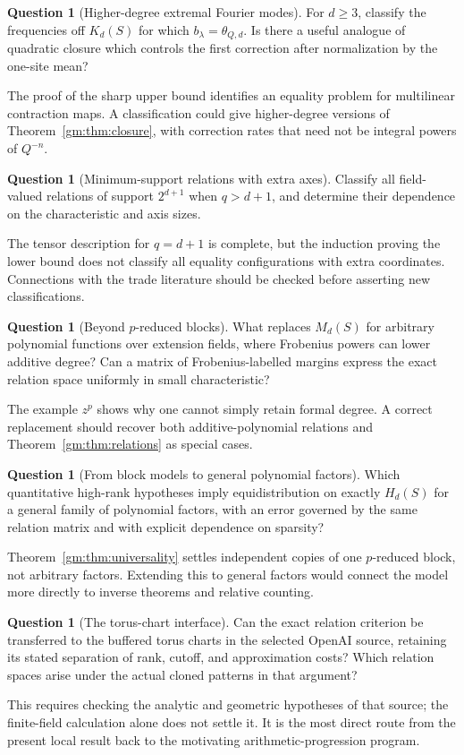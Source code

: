 \documentclass[11pt,a4paper]{article}
\numberwithin{equation}{section}
\theoremstyle{definition}
\newtheorem{question}[theorem]{Question}
\theoremstyle{remark}
\newcommand{\1}{\mathbf 1}
\begin{document}
\begin{question}[Higher-degree extremal Fourier modes]
For $d\geq3$, classify the frequencies off $K_d(S)$ for which
$b_\lambda=\theta_{Q,d}$. Is there a useful analogue of quadratic closure
which controls the first correction after normalization by the one-site
mean?
\end{question}
The proof of the sharp upper bound identifies an equality problem for
multilinear contraction maps. A classification could give higher-degree
versions of Theorem~\ref{gm:thm:closure}, with correction rates that need
not be integral powers of $Q^{-n}$.

\begin{question}[Minimum-support relations with extra axes]
Classify all field-valued relations of support $2^{d+1}$ when $q>d+1$,
and determine their dependence on the characteristic and axis sizes.
\end{question}
The tensor description for $q=d+1$ is complete, but the induction proving
the lower bound does not classify all equality configurations with extra
coordinates. Connections with the trade literature should be checked
before asserting new classifications.

\begin{question}[Beyond $p$-reduced blocks]
What replaces $M_d(S)$ for arbitrary polynomial functions over extension
fields, where Frobenius powers can lower additive degree? Can a matrix of
Frobenius-labelled margins express the exact relation space uniformly in
small characteristic?
\end{question}
The example $z^p$ shows why one cannot simply retain formal degree. A
correct replacement should recover both additive-polynomial relations and
Theorem~\ref{gm:thm:relations} as special cases.

\begin{question}[From block models to general polynomial factors]
Which quantitative high-rank hypotheses imply equidistribution on exactly
$H_d(S)$ for a general family of polynomial factors, with an error governed
by the same relation matrix and with explicit dependence on sparsity?
\end{question}
Theorem~\ref{gm:thm:universality} settles independent copies of one
$p$-reduced block, not arbitrary factors. Extending this to general factors
would connect the model more directly to inverse theorems and relative
counting.

\begin{question}[The torus-chart interface]
Can the exact relation criterion be transferred to the buffered torus
charts in the selected OpenAI source, retaining its stated separation of
rank, cutoff, and approximation costs? Which relation spaces arise under
the actual cloned patterns in that argument?
\end{question}
This requires checking the analytic and geometric hypotheses of that
source; the finite-field calculation alone does not settle it. It is the
most direct route from the present local result back to the motivating
arithmetic-progression program.
\end{document}
